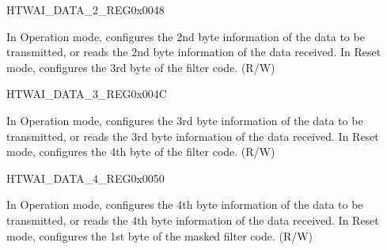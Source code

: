 \begin{register}{H}{TWAI\_DATA\_2\_REG}{0x0048}\label{regdesc:TWAIDATA2REG}
%
%
\regnewline%
\begin{regdesc}\begin{reglist}
\label{fielddesc:TWAIDATA2}\item [TWAI\_DATA\_2] In Operation mode, configures the 2nd byte information of the data to be transmitted, or reads the 2nd byte information of the data received. In Reset mode, configures the 3rd byte of the filter code. (R/W)
\end{reglist}\end{regdesc}
\end{register}


\begin{register}{H}{TWAI\_DATA\_3\_REG}{0x004C}\label{regdesc:TWAIDATA3REG}
%
%
\regnewline%
\begin{regdesc}\begin{reglist}
\label{fielddesc:TWAIDATA3}\item [TWAI\_DATA\_3] In Operation mode, configures the 3rd byte information of the data to be transmitted, or reads the 3rd byte information of the data received. In Reset mode, configures the 4th byte of the filter code. (R/W)
\end{reglist}\end{regdesc}
\end{register}


\begin{register}{H}{TWAI\_DATA\_4\_REG}{0x0050}\label{regdesc:TWAIDATA4REG}
%
%
\regnewline%
\begin{regdesc}\begin{reglist}
\label{fielddesc:TWAIDATA4}\item [TWAI\_DATA\_4] In Operation mode, configures the 4th byte information of the data to be transmitted, or reads the 4th byte information of the data received. In Reset mode, configures the 1st byte of the masked filter code. (R/W)
\end{reglist}\end{regdesc}
\end{register}


